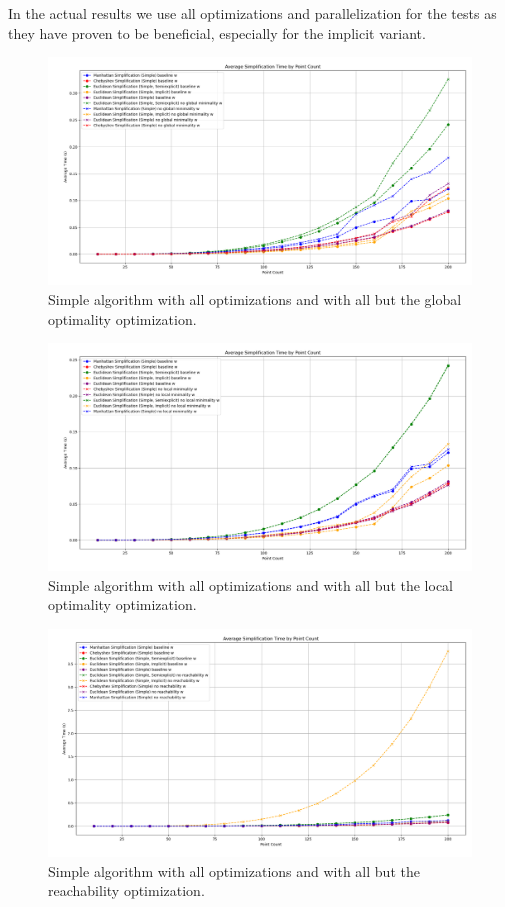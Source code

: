 In the actual results we use all optimizations and parallelization for the tests as they have proven to be beneficial, especially for the implicit variant. 

\begin{figure}[b]
  \centering
	\includegraphics[scale=0.4]{./figures/simple-g.png}
  \caption{Simple algorithm with all optimizations and with all but the global optimality optimization.}
  \label{fig:simple-g}
\end{figure}

\begin{figure}[b]
  \centering
	\includegraphics[scale=0.4]{./figures/simple-l.png}
  \caption{Simple algorithm with all optimizations and with all but the local optimality optimization.}
  \label{fig:simple-l}
\end{figure}

\begin{figure}[b]
  \centering
	\includegraphics[scale=0.4]{./figures/simple-r.png}
  \caption{Simple algorithm with all optimizations and with all but the reachability optimization.}
  \label{fig:simple-r}
\end{figure}

